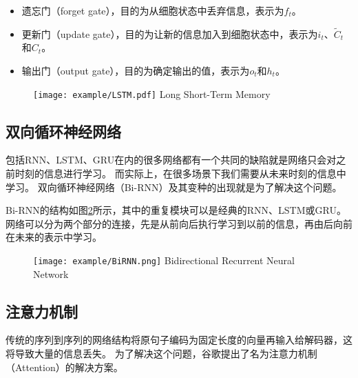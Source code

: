 \begin{itemize}
   \item 遗忘门（forget gate），目的为从细胞状态中丢弃信息，表示为$f_t$。
   \item 更新门（update gate），目的为让新的信息加入到细胞状态中，表示为$i_t$、$\widetilde{C}_t$和$C_t$。
   \item 输出门（output gate），目的为确定输出的值，表示为$o_t$和$h_t$。
\end{itemize}

\begin{figure}[!htp]
  \centering
  \texttt{[image: example/LSTM.pdf]}
    {Long Short-Term Memory}
  \label{fig:LSTM}
\end{figure}

\subsection{双向循环神经网络}

包括RNN、LSTM、GRU在内的很多网络都有一个共同的缺陷就是网络只会对之前时刻的信息进行学习。
而实际上，在很多场景下我们需要从未来时刻的信息中学习。
双向循环神经网络（Bi-RNN）及其变种的出现就是为了解决这个问题。

Bi-RNN的结构如图\ref{fig:BiRNN}所示，其中的重复模块可以是经典的RNN、LSTM或GRU。
网络可以分为两个部分的连接，先是从前向后执行学习到以前的信息，再由后向前在未来的表示中学习。

\begin{figure}[!htp]
  \centering
  \texttt{[image: example/BiRNN.png]}
    {Bidirectional Recurrent Neural Network}
  \label{fig:BiRNN}
\end{figure}

\subsection{注意力机制}

传统的序列到序列的网络结构将原句子编码为固定长度的向量再输入给解码器，这将导致大量的信息丢失。
为了解决这个问题，谷歌提出了名为注意力机制（Attention）的解决方案。

